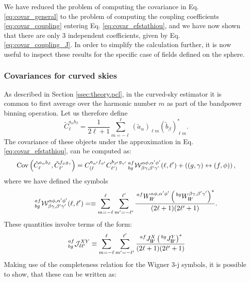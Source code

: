 \documentclass[a4paper,11pt]{article}
\begin{document}
    We have reduced the problem of computing the covariance in Eq. \ref{eq:covar_general} to the problem of computing the coupling coefficients \ref{eq:covar_coupling} entering Eq. \ref{eq:covar_efstathiou}, and we have now shown that there are only 3 independent coefficients, given by Eq. \ref{eq:covar_coupling_J}. In order to simplify the calculation further, it is now useful to inspect these results for the specific case of fields defined on the sphere.
    
    \subsubsection{Covariances for curved skies}
      As described in Section \ref{ssec:theory.pcl}, in the curved-sky estimator it is common to first average over the harmonic number $m$ as part of the bandpower binning operation. Let us therefore define
      \begin{equation}
        \tilde{C}^{a_\alpha b_\beta}_\ell=\frac{1}{2\ell+1}\sum_{m=-\ell}^\ell (\tilde{a}_\alpha)_{\ell m} (\tilde{b}_\beta)_{\ell m}^*.
      \end{equation}
      The covariance of these objects under the approximation in Eq. \ref{eq:covar_efstathiou}, can be computed as:
      \begin{equation}\label{eq:cov_sph}
        {\rm Cov}\left(\tilde{C}^{a_\alpha b_\beta}_\ell,\tilde{C}^{f_\phi g_\gamma}_{\ell'}\right) = C^{a_{\alpha'} f_{\phi'}}_{(\ell}C^{b_{\beta'} g_{\gamma'}}_{\ell')}\,^{af}_{bg}\mathcal{W}^{\alpha\phi,\alpha'\phi'}_{\beta\gamma,\beta'\gamma'}(\ell,\ell')+\left((g,\gamma)\leftrightarrow(f,\phi)\right),
      \end{equation}
      where we have defined the symbols
      \begin{equation}
        ^{af}_{bg}\mathcal{W}^{\alpha\phi,\alpha'\phi'}_{\beta\gamma,\beta'\gamma'}(\ell,\ell')=\equiv\sum_{m=-\ell}^\ell \sum_{m'=-\ell'}^{\ell'}\frac{\,^{af}W^{\alpha\phi,\alpha'\phi'}_{{\bf l}{\bf l}'}\left(\,^{bg}W^{\beta\gamma,\beta'\gamma'}_{{\bf l}{\bf l}'}\right)^*}{(2\ell+1)(2\ell'+1)}.
      \end{equation}
      These quantities involve terms of the form:
      \begin{equation}
        \,^{af}_{bg}\mathcal{J}^{XY}_{\ell\ell'}\equiv\sum_{m=-\ell}^\ell \sum_{m'=-\ell'}^{\ell'}\frac{\,^{af}J^X_{{\bf l}{\bf l}'}\left(\,^{bg}J^Y_{{\bf l}{\bf l}'}\right)^*}{(2\ell+1)(2\ell'+1)}
      \end{equation}
      Making use of the completeness relation for the Wigner 3-j symbols, it is possible to show, that these can be written as:
\end{document}
